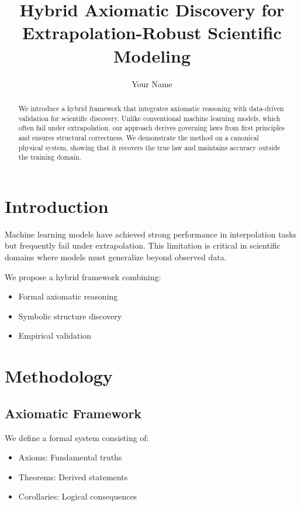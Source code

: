 \documentclass[11pt]{article}
\title{Hybrid Axiomatic Discovery for Extrapolation-Robust Scientific Modeling}
\author{Your Name}
\date{}
\begin{document}
\maketitle

\begin{abstract}
We introduce a hybrid framework that integrates axiomatic reasoning with data-driven validation for scientific discovery. Unlike conventional machine learning models, which often fail under extrapolation, our approach derives governing laws from first principles and ensures structural correctness. We demonstrate the method on a canonical physical system, showing that it recovers the true law and maintains accuracy outside the training domain.
\end{abstract}

\section{Introduction}

Machine learning models have achieved strong performance in interpolation tasks but frequently fail under extrapolation. This limitation is critical in scientific domains where models must generalize beyond observed data.

We propose a hybrid framework combining:

\begin{itemize}
\item Formal axiomatic reasoning
\item Symbolic structure discovery
\item Empirical validation
\end{itemize}

\section{Methodology}

\subsection{Axiomatic Framework}

We define a formal system consisting of:

\begin{itemize}
\item Axioms: Fundamental truths
\item Theorems: Derived statements
\item Corollaries: Logical consequences
\end{itemize}
\end{document}
